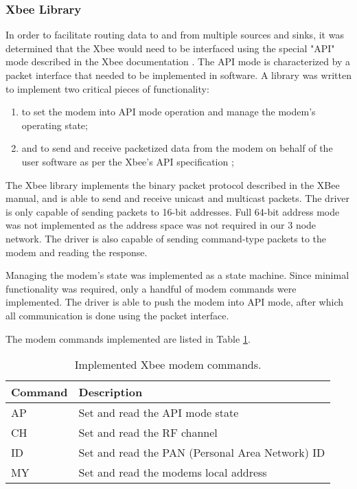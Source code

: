 \subsubsection{Xbee Library}

In order to facilitate routing data to and from multiple sources and sinks, it was determined that the Xbee would need to be interfaced using the special "API" mode described in the Xbee documentation \cite{XBeeManual}. The API mode is characterized by a packet interface that needed to be implemented in software. A library was written to implement two critical pieces of functionality:

\begin{enumerate}
\item to set the modem into API mode operation and manage the modem's operating state;
\item and to send and receive packetized data from the modem on behalf of the user software as per the Xbee's API specification \cite{XBeeManual};
\end{enumerate}

The Xbee library implements the binary packet protocol described in the XBee manual, and is able to send and receive unicast and multicast packets. The driver is only capable of sending packets to 16-bit addresses. Full 64-bit address mode was not implemented as the address space was not required in our 3 node network. The driver is also capable of sending command-type packets to the modem and reading the response.

Managing the modem's state was implemented as a state machine. Since minimal functionality was required, only a handful of modem commands were implemented. The driver is able to push the modem into API mode, after which all communication is done using the packet interface.

The modem commands implemented are listed in Table \ref{tab:xbee_commands}.

\begin{table}
\caption{Implemented Xbee modem commands.\label{tab:xbee_commands}}
\centering{}
\begin{tabular}{|l|l|}
\hline 
Command & Description \tabularnewline
\hline
\hline
AP & Set and read the API mode state \tabularnewline
\hline
CH & Set and read the RF channel \tabularnewline
\hline 
ID & Set and read the PAN (Personal Area Network) ID \tabularnewline
\hline
MY & Set and read the modems local address \tabularnewline
\hline
\end{tabular}
\end{table}

